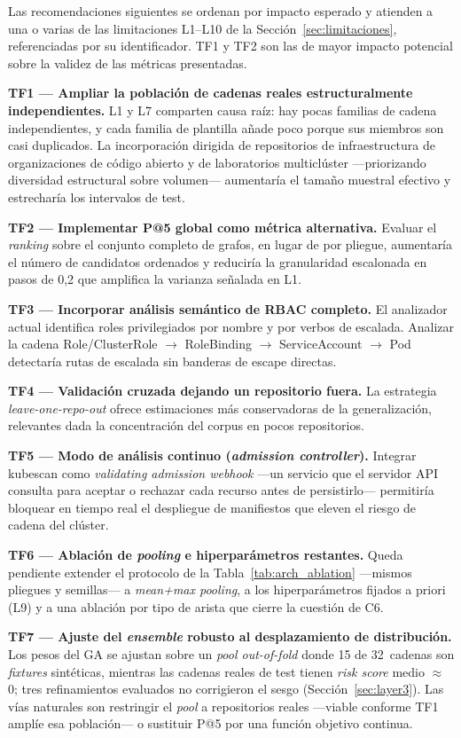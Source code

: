 Las recomendaciones siguientes se ordenan por impacto esperado y atienden a una o
varias de las limitaciones L1--L10 de la Sección~\ref{sec:limitaciones},
referenciadas por su identificador. TF1 y TF2 son las de mayor impacto potencial
sobre la validez de las métricas presentadas.

\textbf{TF1 — Ampliar la población de cadenas reales estructuralmente
independientes.} L1 y L7 comparten causa raíz: hay pocas familias de cadena
independientes, y cada familia de plantilla añade poco porque sus miembros son
casi duplicados. La incorporación dirigida de repositorios de infraestructura de
organizaciones de código abierto y de laboratorios multiclúster —priorizando
diversidad estructural sobre volumen— aumentaría el tamaño muestral efectivo y
estrecharía los intervalos de test.

\textbf{TF2 — Implementar P@5 global como métrica alternativa.} Evaluar el
\textit{ranking} sobre el conjunto completo de grafos, en lugar de por pliegue,
aumentaría el número de candidatos ordenados y reduciría la granularidad escalonada
en pasos de 0,2 que amplifica la varianza señalada en L1.

\textbf{TF3 — Incorporar análisis semántico de \ac{RBAC} completo.} El analizador
actual identifica roles privilegiados por nombre y por verbos de escalada. Analizar
la cadena Role/ClusterRole \(\to\) RoleBinding \(\to\) ServiceAccount \(\to\) Pod
detectaría rutas de escalada sin banderas de escape directas.

\textbf{TF4 — Validación cruzada dejando un repositorio fuera.} La estrategia
\textit{leave-one-repo-out} ofrece estimaciones más conservadoras de la
generalización, relevantes dada la concentración del corpus en pocos repositorios.

\textbf{TF5 — Modo de análisis continuo (\textit{admission controller}).}
Integrar kubescan como \textit{validating admission webhook} —un servicio que el
servidor \acs{API} consulta para aceptar o rechazar cada recurso antes de
persistirlo— permitiría
bloquear en tiempo real el despliegue de manifiestos que eleven el riesgo de cadena
del clúster.

\textbf{TF6 — Ablación de \textit{pooling} e hiperparámetros restantes.} Queda
pendiente extender el protocolo de la Tabla~\ref{tab:arch_ablation} —mismos
pliegues y semillas— a \textit{mean+max pooling}, a los hiperparámetros fijados a
priori (L9) y a una ablación por tipo de arista que cierre la cuestión de C6.

\textbf{TF7 — Ajuste del \textit{ensemble} robusto al desplazamiento de
distribución.} Los pesos del \ac{GA} se ajustan sobre un \textit{pool
out-of-fold} donde 15 de 32~cadenas son \textit{fixtures} sintéticas, mientras las
cadenas reales de test tienen \textit{risk score} medio \(\approx\)0; tres
refinamientos evaluados no corrigieron el sesgo (Sección~\ref{sec:layer3}). Las
vías naturales son restringir el \textit{pool} a repositorios reales —viable
conforme TF1 amplíe esa población— o sustituir P@5 por una función objetivo
continua.

